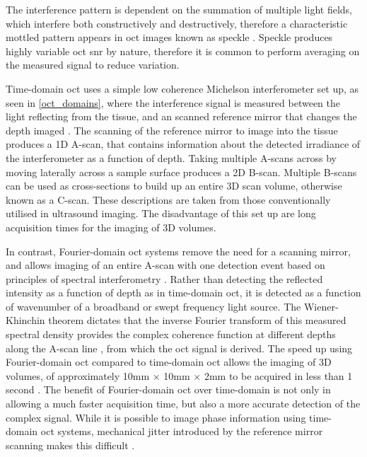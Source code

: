 The interference pattern is dependent on the summation of multiple light fields, which interfere both constructively and destructively, therefore a characteristic mottled pattern appears in \ac{oct} images known as speckle \cite{wijesinghe_improving_2017}. Speckle produces highly variable \ac{oct} \ac{snr} by nature, therefore it is common to perform averaging on the measured signal to reduce variation. 

Time-domain \ac{oct} uses a simple low coherence Michelson interferometer set up, as seen in \autoref{oct_domains}, where the interference signal is measured between the light reflecting from the tissue, and an scanned reference mirror that changes the depth imaged \cite{huang_optical_1991}. The scanning of the reference mirror to image into the tissue produces a 1D A-scan, that contains information about the detected irradiance of the interferometer as a function of depth. Taking multiple A-scans across by moving laterally across a sample surface produces a 2D B-scan. Multiple B-scans can be used as cross-sections to build up an entire 3D scan volume, otherwise known as a C-scan. These descriptions are taken from those conventionally utilised in ultrasound imaging. The disadvantage of this set up are long acquisition times for the imaging of 3D volumes.

In contrast, Fourier-domain \ac{oct} systems remove the need for a scanning mirror, and allows imaging of an entire A-scan with one detection event based on principles of spectral interferometry \cite{chin_parametric_2016}. Rather than detecting the reflected intensity as a function of depth as in time-domain \ac{oct}, it is detected as a function of wavenumber of a broadband or swept frequency light source. The Wiener-Khinchin theorem dictates that the inverse Fourier transform of this measured spectral density provides the complex coherence function at different depths along the A-scan line \cite{schmitt_optical_1999}, from which the \ac{oct} signal is derived. The speed up using Fourier-domain \ac{oct} compared to time-domain \ac{oct} allows the imaging of 3D volumes, of approximately 10mm $\times$ 10mm $\times$ 2mm to be acquired in less than 1 second \cite{kennedy_emergence_2017}. The benefit of Fourier-domain \ac{oct} over time-domain is not only in allowing a much faster acquisition time, but also a more accurate detection of the complex signal. While it is possible to image phase information using time-domain \ac{oct} systems, mechanical jitter introduced by the reference mirror scanning makes this difficult \cite{wijesinghe_improving_2017}.

